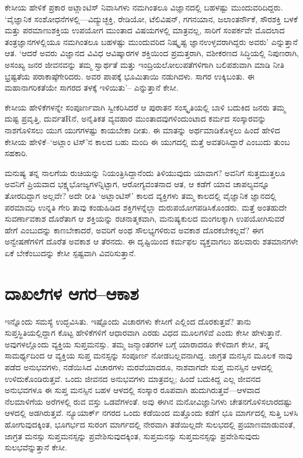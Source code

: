 ಕೇಸೀಯ ಹೇಳಿಕೆ ಪ್ರಕಾರ ಅಟ್ಲಾಂಟಿಸ್ ನಿವಾಸಿಗಳು ನಮಗಿಂತಲೂ ವಿಜ್ಞಾನದಲ್ಲಿ ಬಹಳಷ್ಟು ಮುಂದುವರಿದಿದ್ದರು. ‘ವೈಜ್ಞಾನಿಕ ಸಂಶೋಧನೆಗಳಲ್ಲಿ—ವಿದ್ಯುಚ್ಛಕ್ತಿ, ರೇಡಿಯೋ, ಟೆಲಿವಿಷನ್, ಗಗನಯಾನ, ಜಲಾಂತರ್ನೌಕೆ, ಸೌರಶಕ್ತಿ ಬಳಕೆ ಮತ್ತು ಪರಮಾಣುಶಕ್ತಿಯ ಉಪಯೋಗ ಮುಂತಾದ ವಿಷಯಗಳಲ್ಲಿ ಮಾತ್ರವಲ್ಲ, ಸಾರಿಗೆ ಸಂಪರ್ಕವೇ ಮೊದಲಾದ ತಂತ್ರಜ್ಞಾನಗಳಲ್ಲಿಯೂ ನಮಗಿಂತಲೂ ಬಹಳಷ್ಟು ಮುಂದುವರಿದ ನಿಷ್ಕೃಷ್ಟ ಜ್ಞಾನಉಳ್ಳವರಾಗಿದ್ದರು ಅವರು’ ಎನ್ನುತ್ತಾನೆ ಆತ. ‘ಆದರೆ ಅವರು ವಿಜ್ಞಾನದ ವಿವಿಧ ಆವಿಷ್ಕಾರಗಳ ಶಕ್ತಿಯಿಂದ ಪ್ರಮತ್ತರಾಗಿ, ವಶೀಕರಣದ ಸಿದ್ಧಿಯಲ್ಲಿ ನಿಪುಣರಾಗಿ, ಅಸಂಖ್ಯ ಜನರ ಜೀವನವನ್ನು ತಮ್ಮ ಸ್ವಾರ್ಥತೆ ಮತ್ತು ಇಂದ್ರಿಯಲೋಲುಪತೆಗಳಿಗಾಗಿ ಬಲಿಪಶುವಾಗಿ ಮಾಡಿ ನೀತಿ ಭ್ರಷ್ಟತೆಯ ಪರಾಕಾಷ್ಠೆಗೇರಿದರು. ಅವರ ಪಾಪಕ್ಕೆ ಭೂಮಿತಾಯಿ ನಡುಗಿದಳು. ಸಾಗರ ಉಕ್ಕಿಬಂತು. ಈ ಮಹಾನಾಗರಿಕತೆಯೇ ಸಾಗರದ ತಳಕ್ಕೆ ಇಳಿಯಿತು’– ಎನ್ನುತ್ತಾನೆ ಕೇಸೀ.

ಕೇಸೀಯ ಹೇಳಿಕೆಗಳನ್ನೇ ಸಂಪೂರ್ಣವಾಗಿ ಸ್ವೀಕರಿಸಿದರೆ ಆ ಪುರಾತನ ಸಂಸ್ಕೃತಿಯಲ್ಲಿ ಬಾಳಿ ಬದುಕಿದ ಜನರು ತಮ್ಮ ದುಷ್ಟ ಪ್ರವೃತ್ತಿ, ದುರ್ವತRನೆ, ಅನೈತಿಕತ ವ್ಯವಹಾರ ಮುಂತಾದವುಗಳಿಂದುಂಟಾದ ಕರ್ಮದ ಸಂಸ್ಕಾರವನ್ನು ನಾಶಗೊಳಿಸಲು ಯುಗ ಯುಗಗಳಷ್ಟು ಕಾಯಬೇಕಾ ದೀತು. ಈ ಮಾತನ್ನು ಅರ್ಥಮಾಡಿಕೊಳ್ಳಲು ಹಿಂದೆ ಹೇಳಿದ ಕೇಸೀಯ ಹೇಳಿಕೆ–‘ಅಟ್ಲಾಂ ಟಿಸ್​’ನ ಕಾಲದ ಬಹು ಮಂದಿ ಈ ಯುಗದಲ್ಲಿ ಮತ್ತೆ ಅವತರಿಸಿದ್ದಾರೆ ಎಂಬುದು ತುಂಬ ಸಹಕಾರಿ.

ಮನುಷ್ಯ ತನ್ನ ನಾಲಗೆಯ ರುಚಿಯನ್ನು ನಿಯಂತ್ರಿಸಿದ್ದಾನೆಂದು ತಿಳಿಯುವುದು ಯಾವಾಗ? ಅವನಿಗೆ ಸುತ್ತಮುತ್ತಲೂ ಅವನಿಗೆ ಪ್ರಿಯವಾದ ಭಕ್ಷ್ಯಭೋಜ್ಯಗಳನ್ನಿಟ್ಟಾಗ, ಆರೋಗ್ಯವಂತನಾದ ಆತ, ಆ ಕಡೆಗೆ ಯಾವ ಚಾಪಲ್ಯವನ್ನೂ ತೋರದಿದ್ದಾಗ ಅಲ್ಲವೇ? ಅದೇ ರೀತಿ ‘ಅಟ್ಲಾಂಟಿಸ್​​’ ಕಾಲದ ವ್ಯಕ್ತಿಗಳು ತಮ್ಮ ಕಾಲದಲ್ಲಿ ವೈಜ್ಞಾನಿಕ ಜ್ಞಾನದಲ್ಲಿ ಪರಮಾವಧಿ ಉನ್ನತಿ ಗೇರಿ ತಾವು ಕಂಡುಹಿಡಿದ ಶಕ್ತಿಗಳನ್ನೆಲ್ಲಾ ದುರುಪಯೋಗಪಡಿಸಿಕೊಂಡರು. ಮತ್ತೆ ಅಂತಹುದೇ ಸುವರ್ಣಾವಕಾಶ ದೊರೆತಾಗ ಆ ಶಕ್ತಿಯನ್ನು ರಚನಾತ್ಮಕವಾಗಿ, ಮನುಷ್ಯಕುಲದ ಮಂಗಲಕ್ಕಾಗಿ ಉಪಯೋಗಿಸುವರೆ ಹೇಗೆ ಎಂಬುದನ್ನು ಕಾಣಬೇಕಾದರೆ, ಅವರಿಗೆ ಅಂಥ ಸೌಲಭ್ಯಗಳಿರುವ ಅವಕಾಶ ದೊರಕಬೇಕಲ್ಲವೆ? ಈಗ ಅನ್ವೇಷಣೆಗಳಿಗೆ ದೊರೆತ ಅವಕಾಶ ಆ ತೆರನದು. ಈ ದೃಷ್ಟಿಯಿಂದ ಕರ್ಮಫಲ ವ್ಯಕ್ತವಾಗಲು ಹಲವಾರು ಶತಮಾನಗಳೇ ಏಕೆ ಬೇಕೆಂಬುದನ್ನು ಕೇಸೀ ಸ್ಪಷ್ಟವಾಗಿ ವಿವರಿಸುತ್ತಾನೆ.


\section{ದಾಖಲೆಗಳ ಆಗರ–ಆಕಾಶ}

ಇನ್ನೊಂದು ಸಮಸ್ಯೆ ಉದ್ಭವಿಸಿತು. ಇಷ್ಟೊಂದು ವಿಚಾರಗಳು ಕೇಸೀಗೆ ಎಲ್ಲಿಂದ ದೊರಕುತ್ತವೆ? ತಾನು ಸುಪ್ತಸ್ಥಿತಿಯಲ್ಲಿದ್ದಾಗ ಕೊಟ್ಟ ಹೇಳಿಕೆಗಳಿಗೆ ಆಧಾರವಾಗಿ ಎರಡು ವಿಧದ ಮೂಲಗಳಿವೆ ಎಂದು ಕೇಸೀ ಹೇಳುತ್ತಾನೆ. ಅವುಗಳಲ್ಲೊಂದು ವ್ಯಕ್ತಿಯ ಸುಪ್ತಮನಸ್ಸು. ತಮ್ಮ ಜನ್ಮಾಂತರಗಳ ಬಗ್ಗೆ ಯಾರಾದರೂ ಕೇಳಿದಾಗ ಕೇಸೀ, ತನ್ನ ಸಾಮರ್ಥ್ಯದಿಂದ ಆ ವ್ಯಕ್ತಿಯ ಸುಪ್ತ ಮನಸ್ಸನ್ನು ಸಂಪೂರ್ಣ ನೋಡಬಲ್ಲವನಾಗಿದ್ದ. ಜಾಗ್ರತ ಮನಸ್ಸಿನ ಮೂಲಕ ನಾವು ಪಡೆದ ಅನುಭವಗಳು, ನಡೆಯಿಸಿದ ವಿಚಾರಗಳು ಮರವೆಯಾದರೂ, ನಾಶವಾಗದೇ ಸುಪ್ತ ಮನಸ್ಸಿನ ಆಳದಲ್ಲಿ ಉಳಿದುಕೊಂಡಿರುತ್ತವೆ. ಒಂದು ಜೀವನದ ಅನುಭವಗಳು ಮಾತ್ರವಲ್ಲ; ಹಿಂದೆ ಬದುಕಿದ್ದ ಎಲ್ಲ ಜೀವನದ ಅನುಭವಗಳೂ ಈ ಸುಪ್ತ ಮನಸ್ಸಿನ  ಬಹಳ ಆಳದಲ್ಲಿ ಸಂಸ್ಕಾರ ರೂಪವಾಗಿ ಹುದುಗಿರುತ್ತವೆ—ಆಳವಾದ ನೆಲಮಾಳಿಗೆಯ ಅರೆಗಳಲ್ಲಿ ರುವ ವಸ್ತು ಒಡವೆಗಳಂತೆ. ಅವು ಈಗಿನ ಮನೋವಿಜ್ಞಾನಿಗಳು ಚೇತನಗೊಳಿಸಲಾರದಷ್ಟು ಆಳದಲ್ಲಿ ಅಡಗಿರುತ್ತವೆ. ನ್ಯೂಯಾರ್ಕ್ ನಗರದ ಒಂದು ಕಡೆಯಿಂದ ಮತ್ತೊಂದು ಕಡೆಗೆ ಭೂ ಮಾರ್ಗದಲ್ಲಿ ಸುತ್ತಿ ಬಳಸಿ ಹೋಗುವುದಕ್ಕಿಂತ, ಭೂಗರ್ಭದ ಸುರಂಗ ಮಾರ್ಗದಲ್ಲಿ ನೇರವಾಗಿ ತಡೆಯಿಲ್ಲದೇ ಸುಲಭದಲ್ಲಿ ಪ್ರಯಾಣಮಾಡುವಂತೆ, ಜಾಗ್ರತ ಮನಸ್ಸು ಸುಪ್ತಮನಸ್ಸನ್ನು ಪ್ರವೇಶಿಸುವುದಕ್ಕಿಂತ, ಸುಪ್ತಮನಸ್ಸು ಸುಪ್ತಮನಸ್ಸನ್ನು ಪ್ರವೇಶಿಸುವುದು ಸುಲಭವೆನ್ನುತ್ತಾನೆ ಕೇಸೀ.

